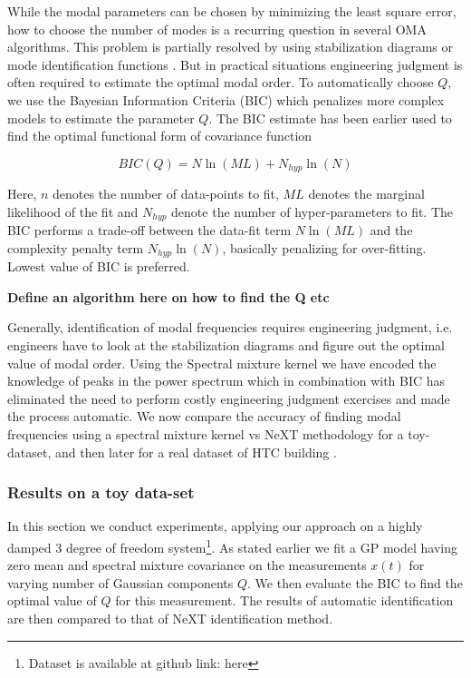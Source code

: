 While the modal parameters can be chosen by minimizing the least square error, how to choose the number of modes is a recurring question in several OMA algorithms. This problem is partially resolved by using stabilization diagrams or mode identification functions \cite{allemang1998unified, williams1985multivariate, shih1988complex}. But in practical situations engineering judgment is often required to estimate the optimal modal order. To automatically choose $Q$, we use the Bayesian Information Criteria (BIC) \cite{findley1991counterexamples} which penalizes more complex models to estimate the parameter $Q$. The BIC estimate has been earlier used to find the optimal functional form of covariance function \cite{duvenaud2013structure}

\begin{equation}\label{eq:BIC}
    BIC(Q) = N\ln(ML) + N_{hyp}\ln(N)
\end{equation}

Here, $n$ denotes the number of data-points to fit, $ML$ denotes the marginal likelihood of the fit and $N_{hyp}$ denote the number of hyper-parameters to fit. The BIC performs a trade-off between the data-fit term $N\ln(ML)$ and the complexity penalty term $N_{hyp}\ln(N)$, basically penalizing for over-fitting. Lowest value of BIC is preferred. 

\textbf{Define an algorithm here on how to find the Q etc}

Generally, identification of modal frequencies requires engineering judgment, i.e. engineers have to look at the stabilization diagrams and figure out the optimal value of modal order. Using the Spectral mixture kernel we have encoded the knowledge of peaks in the power spectrum which in combination with BIC has eliminated the need to perform costly engineering judgment exercises and made the process automatic. We now compare the accuracy of finding modal frequencies using a spectral mixture kernel vs NeXT methodology for a toy-dataset, and then later for a real dataset of HTC building \cite{brincker2000modal}.

\subsubsection{Results on a toy data-set}
In this section we conduct experiments, applying our approach on a highly damped 3 degree of freedom system\footnote{Dataset is available at github link: here}. As stated earlier we fit a GP model having zero mean and spectral mixture covariance on the measurements $x(t)$ for varying number of Gaussian components $Q$. We then evaluate the BIC to find the optimal value of $Q$ for this measurement. The results of automatic identification are then compared to that of NeXT identification method. 

